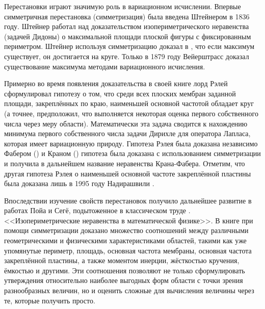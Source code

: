 {\actuality}
Перестановки играют значимую роль в вариационном исчислении.
Впервые симметричная перестановка (симметризация) была введена Штейнером в 1836 году.
Штейнер работал над доказательством изопериметрического неравенства (задачей Дидоны)
о максимальной площади плоской фигуры с фиксированным периметром.
Штейнер используя симметризацию доказал в \cite{Steiner}, что если максимум существует, он достигается на круге.
Только в 1879 году Вейерштрасс доказал существование максимума методами вариационного исчисления.

Примерно во время появления доказательства в своей книге \cite{Rayleigh} лорд Рэлей сформулировал гипотезу
о том, что среди всех плоских мембран заданной площади, закреплённых по краю, наименьшей основной частотой обладает круг
(а точнее, предположил, что выполняется некоторая оценка первого собственного числа через меру области).
Математически эта задача сводится к нахождению минимума первого собственного числа задачи Дирихле для оператора Лапласа,
которая имеет вариационную природу.
Гипотеза Рэлея была доказана независимо Фабером (\cite{Faber}) и Краном (\cite{Krahn}) гипотеза была доказана
с использованием симметризации и получила в дальнейшем название неравенства Крана-Фабера.
Отметим, что другая гипотеза Рэлея о наименьшей основной частоте закреплённой пластины
была доказана лишь в 1995 году Надирашвили \cite{Nadirashvili}.

Впоследствии изучение свойств перестановок получило дальнейшее развитие в работах Пойа и Сегё, подытоженное в классическом труде \cite{PS_book}.
<<Изопериметрические неравенства в математической физике>>.
В книге при помощи симметризации доказано множество соотношений между различными геометрическими и физическими характеристиками областей,
такими как уже упомянутые периметр, площадь, основная частота мембраны, основная частота закреплённой пластины,
а также моментом инерции, жёсткостью кручения, ёмкостью и другими.
Эти соотношения позволяют не только сформулировать утверждения относительно наиболее выгодных форм области
с точки зрения разнообразных величин,
но и оценить сложные для вычисления величины через те, которые получить просто.

